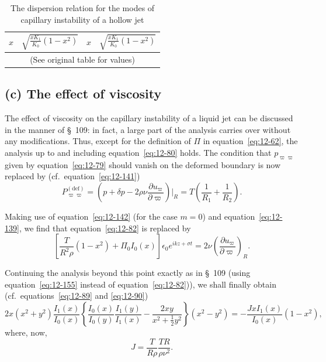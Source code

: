 \begin{table}[ht]
\centering
\caption{The dispersion relation for the modes of capillary instability of a hollow jet}
\label{tab:LX}
\begin{tabular}{cccc}
\hline
$x$ & $\sqrt{\frac{xK_1}{K_0}(1-x^2)}$ & $x$ & $\sqrt{\frac{xK_1}{K_0}(1-x^2)}$ \\
\hline
\multicolumn{4}{c}{(See original table for values)} \\
\hline
\end{tabular}
\end{table}


\subsection*{(c) The effect of viscosity}

The effect of viscosity on the capillary instability of a liquid jet can be discussed in the manner of \S~109: in fact, a large part of the analysis carries over without any modifications. Thus, except for the definition of $\Pi$ in equation~\eqref{eq:12-62}, the analysis up to and including equation~\eqref{eq:12-80} holds. The condition that $p_{\varpi\varpi}$ given by equation~\eqref{eq:12-79} should vanish on the deformed boundary is now replaced by (cf.\ equation~\eqref{eq:12-141})
\begin{equation}
\label{eq:12-154}
P_{\varpi\varpi}^{(\mathrm{def})} = (p+\delta p - 2\rho\nu \frac{\partial u_\varpi}{\partial \varpi})|_R = T\left(\frac{1}{R_1}+\frac{1}{R_2}\right).
\end{equation}

Making use of equation~\eqref{eq:12-142} (for the case $m = 0$) and equation~\eqref{eq:12-139}, we find that equation~\eqref{eq:12-82} is replaced by
\begin{equation}
\label{eq:12-155}
\left[\frac{T}{R^2\rho}(1-x^2) + \Pi_0 I_0(x)\right]\epsilon_0 e^{ikz+\sigma t} = 2\nu\left(\frac{\partial u_\varpi}{\partial \varpi}\right)_R.
\end{equation}

Continuing the analysis beyond this point exactly as in \S~109 (using equation~\eqref{eq:12-155} instead of equation~\eqref{eq:12-82})), we shall finally obtain (cf.\ equations~\eqref{eq:12-89} and \eqref{eq:12-90})
\begin{equation}
\label{eq:12-156}
2x(x^2+y^2) \frac{I_1(x)}{I_0(x)}\left\{\frac{I_0(x)}{I_0(y)}\frac{I_1(y)}{I_1(x)} - \frac{2xy}{x^2+\frac{1}{2}y^2}\right\}(x^2-y^2) = -\frac{J x I_1(x)}{I_0(x)}(1-x^2),
\end{equation}
where, now,
\begin{equation}
\label{eq:12-157}
J = \frac{T}{R\rho}\frac{TR}{\rho\nu^2}.
\end{equation}

